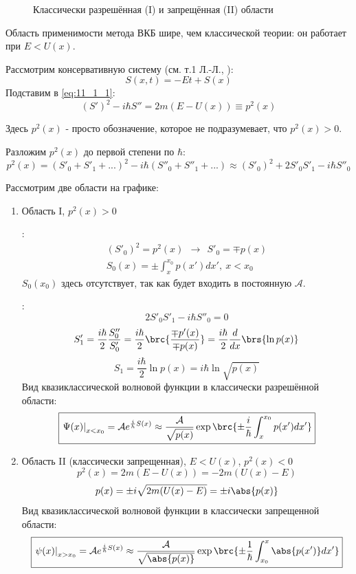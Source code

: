 \begin{figure}
\centering
{}
\caption{Классически разрешённая (I) и запрещённая (II) области} \label{fig:1}
\end{figure}

Область применимости метода ВКБ шире, чем классической теории: он работает при $E < U(x)$.

Рассмотрим консервативную систему (см. т.1 Л.-Л., ):
$$
S(x,t) = -Et + S(x)
$$
Подставим в \eqref{eq:11_1_1}:
$$
(S')^2 - i\hbar S'' = 2m(E-U(x)) \equiv p^2(x)
$$

Здесь $p^2(x)$ - просто обозначение, которое не подразумевает, что $p^2(x) > 0$.

Разложим $p^2(x)$ до первой степени по $\hbar$:
$$
p^2(x) = (S'_0 + S'_1 + ...)^2 - i\hbar(S''_0+S''_1+...) \approx (S'_0)^2 + 2 S'_0 S'_1 - i\hbar S''_0
$$

Рассмотрим две области на графике:
\renewcommand{\labelenumi}{(\alph{enumi})}
\begin{enumerate}
\item Область I, $p^2(x)>0$

:
$$
\begin{gathered}
(S'_0)^2 = p^2(x) ~~ \rightarrow~~ S'_0 = \mp p(x)\\
\boxed{S_0(x) = \pm \int_x^{x_0} p(x')dx',~ x<x_0}
\end{gathered}
$$
$S_0(x_0)$ здесь отсутствует, так как будет входить в постоянную $\mathcal{A}$.

:
$$
2 S'_0 S'_1 - i\hbar S''_0 = 0
$$
$$
S'_1 = \frac{i\hbar}{2} \frac{S''_0}{S'_0} = \frac{i\hbar}{2} \brc{\frac{\mp p'(x)}{\mp p(x)}} = \frac{i\hbar}{2} \frac{d}{dx}\brs{\ln p(x)}
$$
$$
S_1 = \frac{i\hbar}{2} \ln p(x) = \boxed{i\hbar \ln \sqrt{p(x)}}
$$
Вид квазиклассической волновой функции в классически разрешённой области:
$$
\boxed{\left. \Psi(x) \right|_{x<x_0} = \mathcal{A} e^{\frac{i}{h} S(x)} \approx \frac{\mathcal{A}}{\sqrt{p(x)}} \exp \brc{\pm\frac{i}{\hbar}\int_x^{x_0} p(x')dx'} }
$$

\item Область II (классически запрещенная), $E<U(x)$, $p^2(x)<0$
$$
p^2(x) = 2m(E-U(x)) = -2m(U(x)-E)
$$
$$
p(x) = \pm i \sqrt{2m(U(x)-E)} = \pm i \abs{p(x)}
$$
Вид квазиклассической волновой функции в классически запрещенной области:
$$
\boxed{\left. \psi(x) \right|_{x>x_0} = \mathcal{A} e^{\frac{i}{\hbar} S(x)} \approx \frac{\mathcal{A}}{\sqrt{\abs{p(x)}}} \exp \brc{\pm\frac{1}{\hbar}\int_{x_0}^{x} \abs{p(x')}dx'} }
$$
\end{enumerate}

